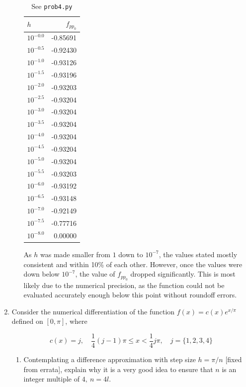 \documentclass[12pt]{article}
\begin{document}
\begin{enumerate}
\begin{enumerate}
\begin{table}[H]
\centering
\begin{tabular}{l r}
\hline \hline
$h$ & $f_{pp_{0}}$\\
\hline
$10^{-0.0}$  &  -0.85691 \\
$10^{-0.5}$  &  -0.92430 \\
$10^{-1.0}$  &  -0.93126 \\
$10^{-1.5}$  &  -0.93196 \\
$10^{-2.0}$  &  -0.93203 \\
$10^{-2.5}$  &  -0.93204 \\
$10^{-3.0}$  &  -0.93204 \\
$10^{-3.5}$  &  -0.93204 \\
$10^{-4.0}$  &  -0.93204 \\
$10^{-4.5}$  &  -0.93204 \\
$10^{-5.0}$  &  -0.93204 \\
$10^{-5.5}$  &  -0.93203 \\
$10^{-6.0}$  &  -0.93192 \\
$10^{-6.5}$  &  -0.93148 \\
$10^{-7.0}$  &  -0.92149 \\
$10^{-7.5}$  &  -0.77716 \\
$10^{-8.0}$  &   0.00000 \\
\hline
\end{tabular}
\caption{See {\tt prob4.py}}
\end{table}

As $h$ was made smaller from $1$ down to $10^{-7}$, the values stated mostly consistent and within 10\% of each other. However, once the 
values were down below $10^{-7}$, the value of $f_{pp_{0}}$ dropped significantly. This is most likely due to the numerical precision, as the function could not be evaluated accurately enough below this point without roundoff errors. 

\end{enumerate}

\newpage

\item Consider the numerical differentiation of the function $f(x) = c(x) e^{x/\pi}$ defined on $[0, \pi]$, where 

\[
	c(x) = j, \quad \frac{1}{4}(j-1)\pi \leq x < \frac{1}{4}j\pi, \quad j = \{ 1, 2, 3, 4\}
\]

\begin{enumerate}
\item Contemplating a difference approximation with step size $h = \pi/n$ [fixed from errata], explain why it is a very good idea to ensure that $n$ is an integer multiple of $4,\ n = 4l$. 


\end{enumerate}
\end{enumerate}
\end{document}
